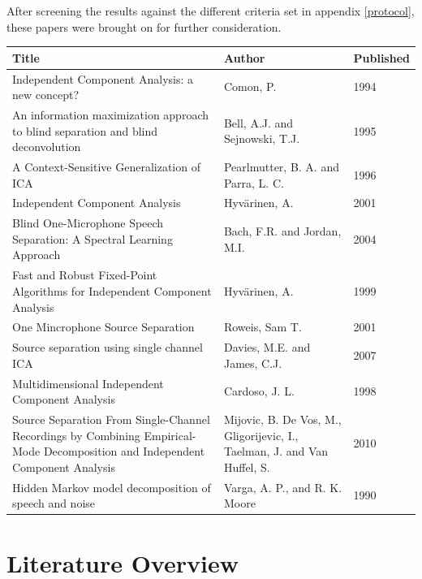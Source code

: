 \documentclass[11pt, oneside, a4paper]{report}
\begin{document}
After screening the results against the different criteria set in appendix \ref{protocol}, these papers were brought on for further consideration.

\begin{table} [ht]
    \begin{tabular}{|p{6cm}|p{4cm}|p{2cm}|}
        \hline
        \textbf{Title} & \textbf{Author} & \textbf{Published} \\ \hline
        Independent Component Analysis: a new concept? & Comon, P. & 1994\\ \hline
        An information maximization approach to blind separation and blind deconvolution  & Bell, A.J. and Sejnowski, T.J. & 1995\\ \hline
        A Context-Sensitive Generalization of ICA & Pearlmutter, B. A. and Parra, L. C. & 1996\\ \hline
        Independent Component Analysis & Hyvärinen, A. & 2001\\ \hline
        Blind One-Microphone Speech Separation: A Spectral Learning Approach & Bach, F.R. and Jordan, M.I. & 2004\\ \hline
        Fast and Robust Fixed-Point Algorithms for Independent Component Analysis & Hyvärinen, A. & 1999\\ \hline
        One Mincrophone Source Separation & Roweis, Sam T. & 2001\\ \hline
        Source separation using single channel ICA & Davies, M.E. and James, C.J. & 2007 \\ \hline
        Multidimensional Independent Component Analysis& Cardoso, J. L. & 1998\\ \hline
        Source Separation From Single-Channel Recordings by Combining Empirical-Mode Decomposition and Independent Component Analysis & Mijovic, B. De Vos, M., Gligorijevic, I., Taelman, J. and Van Huffel, S. & 2010\\ \hline
        Hidden Markov model decomposition of speech and noise & Varga, A. P., and R. K. Moore & 1990\\
        \hline
    \end{tabular}
\end{table}



\section{Literature Overview}\label{overview}
\end{document}

